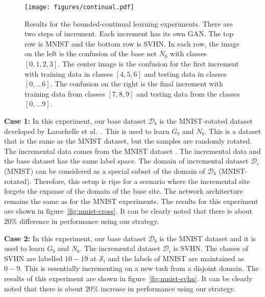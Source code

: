 \documentclass[10pt,twocolumn,letterpaper]{article}
\def \cS{{\mathcal{S}}}
\def \cD{{\mathcal{D}}}
\begin{document}
	
	\begin{figure*}[t]
		\begin{center}
			\texttt{[image: figures/continual.pdf]}		
		\end{center}
		
		\caption{Results for the bounded-continual learning experiments. There are two steps of increment. Each increment has its own GAN. The top row is MNIST and the bottom row is SVHN. In each row, the image on the left is the confusion of the base net $N_0$ with classes $[0,1,2,3]$. The center image is the confusion for the first increment with training data in classes $[4,5,6]$ and testing data in classes $[0, \dots 6]$. The confusion on the right is the final increment with training data from classes $[7,8,9]$ and testing data from the classes $[0, \dots 9]$.}
		
		\label{fig:continual}
	\end{figure*}
	\noindent\textbf{Case 1:}
	In this experiment, our base dataset $\cD_b$ is the MNIST-rotated dataset developed by Larochelle et al.~\cite{larochelle2007empirical}.
	This is used to learn $G_b$ and $N_b$.
	This is a dataset that is the same as the MNIST dataset, but the samples are randomly rotated.
	The incremental data comes from the MNIST dataset .
	The incremental data and the base dataset has the same label space.
	The domain of incremental dataset $\cD_i$ (MNIST) can be considered as a special subset of the domain of $\cD_b$ (MNIST-rotated). 
	Therefore, this setup is ripe for a scenario where the incremental site forgets the expanse of the domain of the base site. 
	The network architecture remains the same as for the MNIST experiments.
	The results for this experiment are shown in figure~\ref{fig:mnist-cross}.
	It can be clearly noted that there is about $20\%$ difference in performance using our strategy.
	
	\noindent\textbf{Case 2:}
	In this experiment, our base dataset $\cD_b$ is the MNIST dataset and it is used to learn $G_b$ and $N_b$.
	The incremental dataset $\cD_i$ is SVHN. 
	The classes of SVHN are labelled $10 - 19$ at $\cS_i$ and the labels of MNIST are maintained as $0-9$.
	This is essentially incrementing on a new task from a disjoint domain.
	The results of this experiment are shown in figure~\ref{fig:mnist-svhn}.
	It can be clearly noted that there is about $20\%$ increase in performance using our strategy.
	
\end{document}

